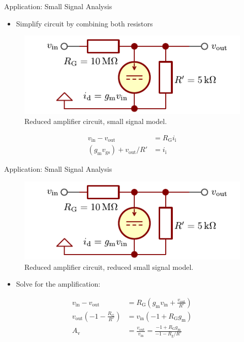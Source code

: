 \begin{frame}{Application: Small Signal Analysis}
    \begin{itemize}
        \item Simplify circuit by combining both resistors
    \end{itemize}
    \begin{figure}
        \centering
        \includegraphics{../assets/mosfet_amplifier_small_signal_reduced.pdf}
        \caption{Reduced amplifier circuit, small signal model.}
        \label{fig:mosfet_amplifier_ac}
    \end{figure}

    \begin{align*}
        v_{\mathrm{in}}-v_{\mathrm{out}}&=R_{\mathrm{G}} i_{\mathrm{i}} \\
        (g_{\mathrm{m}}v_{\mathrm{gs}})+v_{\mathrm{out}} /R'&=i_{\mathrm{i}}
    \end{align*}
\end{frame}

\begin{frame}{Application: Small Signal Analysis}
    \begin{figure}
        \centering
        \includegraphics{../assets/mosfet_amplifier_small_signal_reduced.pdf}
        \caption{Reduced amplifier circuit, reduced small signal model.}
        \label{fig:mosfet_amplifier_ac}
    \end{figure}
    \begin{itemize}
        \item Solve for the amplification:
    \end{itemize}
    \begin{align*}
        v_{\mathrm{in}}-v_{\mathrm{out}}&=R_{\mathrm{G}}\left( g_{\mathrm{m}}v_{\mathrm{in}}+\frac{v_{\mathrm{out}}}{R'} \right) \\
        v_{\mathrm{out}}\left( -1-\frac{R_{\mathrm{G}}}{R'} \right)&=v_{\mathrm{in}}(-1+R_{\mathrm{G}}g_{\mathrm{m}}) \\
        A_{\mathrm{v}}&= \frac{v_{\mathrm{out}}}{v_{\mathrm{in}}}=\frac{-1+R_{\mathrm{G}}g_{\mathrm{m}}}{-1-R_{\mathrm{g}} / R'}
    \end{align*}
    
\end{frame}